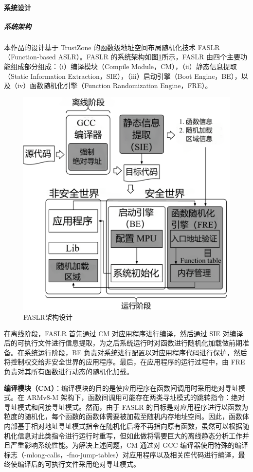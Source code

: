 \documentclass[UTF8,12pt,a4paper,twoside]{ctexart}
\numberwithin{figure}{section}
\begin{document}
\paragraph{系统设计}
\subparagraph{系统架构}
\par 本作品的设计基于 TrustZone 的函数级地址空间布局随机化技术 FASLR（Function-based ASLR）。FASLR 的系统架构如图\ref{fig:alsr_architecture}所示，FASLR 由四个主要功能组成部分组成：（i）编译模块（Compile Module，CM），（ii）静态信息提取（Static Information Extraction，SIE），（iii）启动引擎（Boot Engine，BE），以及（iv）函数随机化引擎（Function Randomization Engine，FRE）。
\begin{figure}[H]
    \centering
    \includegraphics[scale=0.3]{graph/aslr_architecture.png}
    \caption{FASLR架构设计}
    \label{fig:alsr_architecture}
\end{figure}
\par 在离线阶段，FASLR 首先通过 CM 对应用程序进行编译，然后通过 SIE 对编译后的可执行文件进行信息提取，为之后系统运行时对函数进行随机化加载做前期准备。在系统运行阶段，BE 负责对系统进行配置以对应用程序代码进行保护，然后将控制权交给非安全世界的应用程序。最后，在应用程序的运行过程中，由 FRE 负责对其所有函数进行动态的随机化加载。
\par \textbf{编译模块（CM）}：编译模块的目的是使应用程序在函数间调用时采用绝对寻址模式。在 ARMv8-M 架构下，函数间调用可能存在两类寻址模式的跳转指令：绝对寻址模式和间接寻址模式。然而，由于 FASLR 的目标是对应用程序进行以函数为粒度的随机化，每个函数的函数体需要被加载至随机内存地址空间。因此，函数体内部基于相对地址寻址模式指令在随机化后将不再指向原有函数，虽然可以根据随机化信息对此类指令进行运行时重写，但如此做将需要巨大的离线静态分析工作并且严重影响系统性能。为解决上述问题，CM 通过对 GCC 编译器使用特殊的编译标志（-mlong-calls，-fno-jump-tables）对应用程序以及相关库代码进行编译，最终使编译后的可执行文件采用绝对寻址模式。
\end{document}
